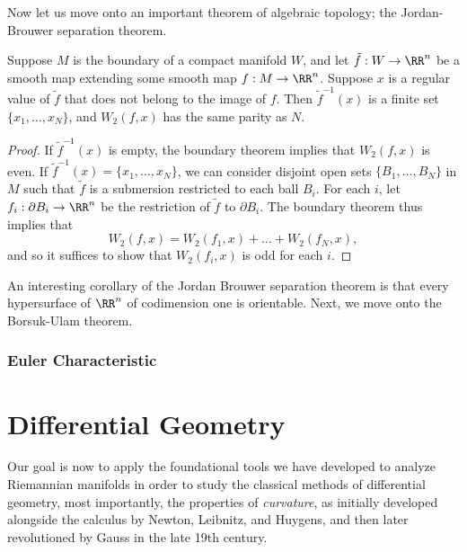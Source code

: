 Now let us move onto an important theorem of algebraic topology; the Jordan-Brouwer separation theorem.

\begin{theorem}
    Suppose $M$ is the boundary of a compact manifold $W$, and let $\tilde{f}: W \to \RR^n$ be a smooth map extending some smooth map $f: M \to \RR^n$. Suppose $x$ is a regular value of $\tilde{f}$ that does not belong to the image of $f$. Then $\tilde{f}^{-1}(x)$ is a finite set $\{ x_1, \dots, x_N \}$, and $W_2(f,x)$ has the same parity as $N$.
\end{theorem}
\begin{proof}
    If $\tilde{f}^{-1}(x)$ is empty, the boundary theorem implies that $W_2(f,x)$ is even. If $\tilde{f}^{-1}(x) = \{ x_1, \dots, x_N \}$, we can consider disjoint open sets $\{ B_1, \dots, B_N \}$ in $M$ such that $\tilde{f}$ is a submersion restricted to each ball $B_i$. For each $i$, let $f_i: \partial B_i \to \RR^n$ be the restriction of $\tilde{f}$ to $\partial B_i$. The boundary theorem thus implies that
    \[ W_2(f,x) = W_2(f_1,x) + \dots + W_2(f_N,x), \]
    and so it suffices to show that $W_2(f_i,x)$ is odd for each $i$.
\end{proof}

An interesting corollary of the Jordan Brouwer separation theorem is that every hypersurface of $\RR^n$ of codimension one is orientable. Next, we move onto the Borsuk-Ulam theorem.



\section{Euler Characteristic}












\part{Differential Geometry}

Our goal is now to apply the foundational tools we have developed to analyze Riemannian manifolds in order to study the classical methods of differential geometry, most importantly, the properties of \emph{curvature}, as initially developed alongside the calculus by Newton, Leibnitz, and Huygens, and then later revolutioned by Gauss in the late 19th century.

